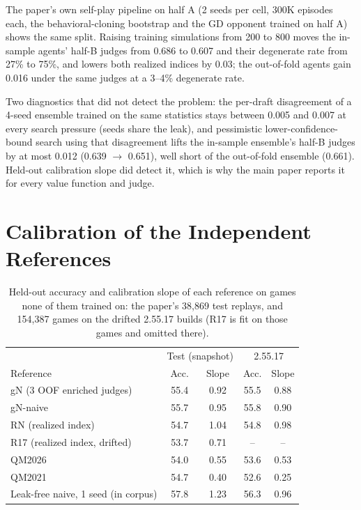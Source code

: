 \documentclass[journal]{IEEEtran}
\begin{document}
The paper's own self-play pipeline on half A (2 seeds per cell, 300K episodes each, the behavioral-cloning bootstrap and the GD opponent trained on half A) shows the same split. Raising training simulations from 200 to 800 moves the in-sample agents' half-B judges from 0.686 to 0.607 and their degenerate rate from 27\% to 75\%, and lowers both realized indices by 0.03; the out-of-fold agents gain 0.016 under the same judges at a 3--4\% degenerate rate.

Two diagnostics that did not detect the problem: the per-draft disagreement of a 4-seed ensemble trained on the same statistics stays between 0.005 and 0.007 at every search pressure (seeds share the leak), and pessimistic lower-confidence-bound search using that disagreement lifts the in-sample ensemble's half-B judges by at most 0.012 (0.639 $\to$ 0.651), well short of the out-of-fold ensemble (0.661). Held-out calibration slope did detect it, which is why the main paper reports it for every value function and judge.

\section{Calibration of the Independent References}
\label{sec:refcal}

\begin{table}[t]
\centering
\caption{Held-out accuracy and calibration slope of each reference on games none of them trained on: the paper's 38,869 test replays, and 154,387 games on the drifted 2.55.17 builds (R17 is fit on those games and omitted there).}
\label{tab:refcal}
\setlength{\tabcolsep}{3pt}
\small
\begin{tabular}{lcccc}
\toprule
& \multicolumn{2}{c}{Test (snapshot)} & \multicolumn{2}{c}{2.55.17} \\
Reference & Acc. & Slope & Acc. & Slope \\
\midrule
gN (3 OOF enriched judges) & 55.4 & 0.92 & 55.5 & 0.88 \\
gN-naive & 55.7 & 0.95 & 55.8 & 0.90 \\
RN (realized index) & 54.7 & 1.04 & 54.8 & 0.98 \\
R17 (realized index, drifted) & 53.7 & 0.71 & -- & -- \\
QM2026 & 54.0 & 0.55 & 53.6 & 0.53 \\
QM2021 & 54.7 & 0.40 & 52.6 & 0.25 \\
\midrule
Leak-free naive, 1 seed (in corpus) & 57.8 & 1.23 & 56.3 & 0.96 \\
\bottomrule
\end{tabular}
\end{table}
\end{document}

